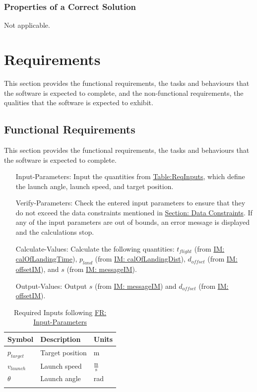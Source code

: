 \documentclass[12pt]{article}
\begin{document}
\subsubsection{Properties of a Correct Solution}
\label{Sec:CorSolProps}
Not applicable.
\section{Requirements}
\label{Sec:Requirements}
This section provides the functional requirements, the tasks and behaviours that the software is expected to complete, and the non-functional requirements, the qualities that the software is expected to exhibit.
\subsection{Functional Requirements}
\label{Sec:FRs}
This section provides the functional requirements, the tasks and behaviours that the software is expected to complete.
\begin{itemize}
\item[Input-Parameters:\phantomsection\label{inputParams}]Input the quantities from \hyperref[Table:ReqInputs]{Table:ReqInputs}, which define the launch angle, launch speed, and target position.
\item[Verify-Parameters:\phantomsection\label{verifyParams}]Check the entered input parameters to ensure that they do not exceed the data constraints mentioned in \hyperref[Sec:DataConstraints]{Section: Data Constraints}. If any of the input parameters are out of bounds, an error message is displayed and the calculations stop.
\item[Calculate-Values:\phantomsection\label{calcValues}]Calculate the following quantities: ${t_{flight}}$ (from \hyperref[IM:calOfLandingTime]{IM: calOfLandingTime}), ${p_{land}}$ (from \hyperref[IM:calOfLandingDist]{IM: calOfLandingDist}), ${d_{offset}}$ (from \hyperref[IM:offsetIM]{IM: offsetIM}), and $s$ (from \hyperref[IM:messageIM]{IM: messageIM}).
\item[Output-Values:\phantomsection\label{outputValues}]Output $s$ (from \hyperref[IM:messageIM]{IM: messageIM}) and ${d_{offset}}$ (from \hyperref[IM:offsetIM]{IM: offsetIM}).
\end{itemize}
\begin{longtable}{l l l}
\toprule
Symbol & Description & Units
\\
\midrule
\endhead
${p_{target}}$ & Target position & m
\\
${v_{launch}}$ & Launch speed & $\frac{\text{m}}{\text{s}}$
\\
$θ$ & Launch angle & rad
\\
\bottomrule
\caption{Required Inputs following \hyperref[inputParams]{FR: Input-Parameters}}
\label{Table:ReqInputs}
\end{longtable}
\end{document}
